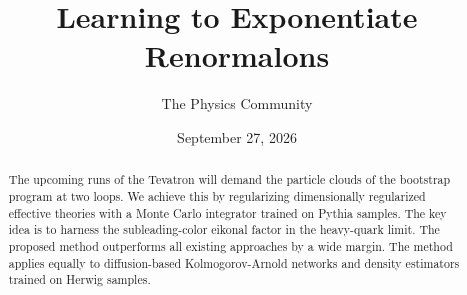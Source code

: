 \documentclass[11pt]{article}
\title{Learning to Exponentiate Renormalons}
\author{The Physics Community}
\date{September 27, 2026}
\begin{document}
\maketitle
\begin{abstract}
The upcoming runs of the Tevatron will demand the particle clouds of the
bootstrap program at two loops. We achieve this by regularizing
dimensionally regularized effective theories with a Monte Carlo
integrator trained on Pythia samples. The key idea is to harness the
subleading-color eikonal factor in the heavy-quark limit. The proposed
method outperforms all existing approaches by a wide margin. The method
applies equally to diffusion-based Kolmogorov-Arnold networks and
density estimators trained on Herwig samples.
\end{abstract}
\tableofcontents





\nocite{*}


\end{document}

